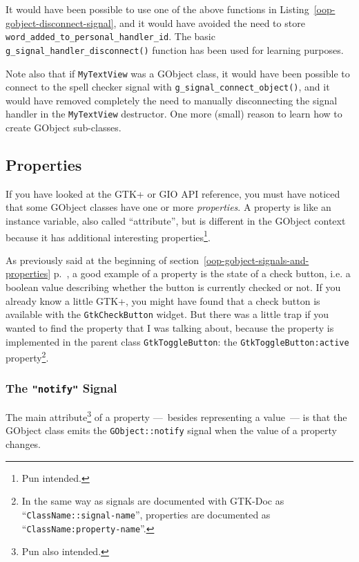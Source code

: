 It would have been possible to use one of the above functions in Listing~\ref{oop-gobject-disconnect-signal}, and it would have avoided the need to store \lstinline{word_added_to_personal_handler_id}. The basic \lstinline{g_signal_handler_disconnect()} function has been used for learning purposes.

Note also that if \lstinline{MyTextView} was a GObject class, it would have been possible to connect to the spell checker signal with \lstinline{g_signal_connect_object()}, and it would have removed completely the need to manually disconnecting the signal handler in the \lstinline{MyTextView} destructor. One more (small) reason to learn how to create GObject sub-classes.

\subsection{Properties}

If you have looked at the GTK+ or GIO API reference, you must have noticed that some GObject classes have one or more \emph{properties}. A property is like an instance variable, also called ``attribute'', but is different in the GObject context because it has additional interesting properties\footnote{Pun intended.}.

As previously said at the beginning of section~\ref{oop-gobject-signals-and-properties} p.~\pageref{oop-gobject-signals-and-properties}, a good example of a property is the state of a check button, i.e. a boolean value describing whether the button is currently checked or not. If you already know a little GTK+, you might have found that a check button is available with the \lstinline{GtkCheckButton} widget. But there was a little trap if you wanted to find the property that I was talking about, because the property is implemented in the parent class \lstinline{GtkToggleButton}: the \lstinline{GtkToggleButton:active} property\footnote{In the same way as signals are documented with GTK-Doc as ``\lstinline{ClassName::signal-name}'', properties are documented as ``\lstinline{ClassName:property-name}''.}.

\subsubsection{The \lstinline{"notify"} Signal}

The main attribute\footnote{Pun also intended.} of a property ---~besides representing a value~--- is that the GObject class emits the \lstinline{GObject::notify} signal when the value of a property changes.

